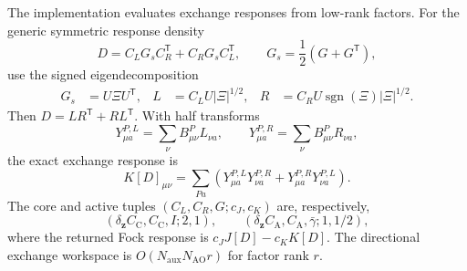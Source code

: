 \documentclass[aip,preprint,nofootinbib]{revtex4-1}
\newcommand{\core}{\mathrm{C}}
\newcommand{\act}{\mathrm{A}}
\begin{document}
The implementation evaluates exchange responses from low-rank factors.  For
the generic symmetric response density
\begin{equation}
 D=C_LG_sC_R^{\mathsf T}+C_RG_sC_L^{\mathsf T},
 \qquad G_s=\frac12(G+G^{\mathsf T}),
 \label{eq:nr-low-rank-density}
\end{equation}
use the signed eigendecomposition
\begin{align}
 G_s&=U\Xi U^{\mathsf T},
 &L&=C_LU|\Xi|^{1/2},
 &R&=C_RU\operatorname{sgn}(\Xi)|\Xi|^{1/2}.
 \label{eq:nr-signed-factorization}
\end{align}
Then $D=LR^{\mathsf T}+RL^{\mathsf T}$.  With half transforms
\begin{equation}
 Y^{P,L}_{\mu a}=\sum_\nu B^P_{\mu\nu}L_{\nu a},
 \qquad
 Y^{P,R}_{\mu a}=\sum_\nu B^P_{\mu\nu}R_{\nu a},
\end{equation}
the exact exchange response is
\begin{equation}
 K[D]_{\mu\nu}=\sum_{Pa}
 \left(Y^{P,L}_{\mu a}Y^{P,R}_{\nu a}
      +Y^{P,R}_{\mu a}Y^{P,L}_{\nu a}\right).
 \label{eq:nr-low-rank-exchange}
\end{equation}
The core and active tuples $(C_L,C_R,G;c_J,c_K)$ are, respectively,
\begin{equation}
 (\delta_{\mathbf z}C_{\core},C_{\core},I;2,1),
 \qquad
 (\delta_{\mathbf z}C_{\act},C_{\act},\bar\gamma;1,1/2),
\end{equation}
where the returned Fock response is $c_JJ[D]-c_KK[D]$.  The directional
exchange workspace is
$O(N_{\mathrm{aux}}N_{\mathrm{AO}}r)$ for factor rank $r$.
\end{document}
